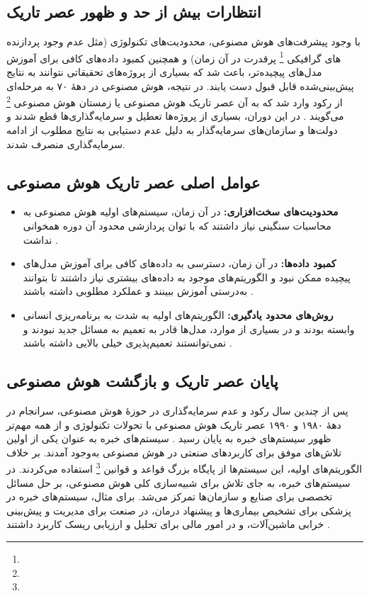 \subsection{انتظارات بیش از حد و ظهور عصر تاریک}

با وجود پیشرفت‌های هوش مصنوعی، محدودیت‌های تکنولوژی (مثل عدم وجود  پردازنده های گرافیکی  \footnote{} پرقدرت در آن زمان) و همچنین کمبود داده‌های کافی برای آموزش مدل‌های پیچیده‌تر، باعث شد که بسیاری از پروژه‌های تحقیقاتی نتوانند به نتایج پیش‌بینی‌شده قابل قبول دست یابند. در نتیجه، هوش مصنوعی در دههٔ ۷۰ به مرحله‌ای از رکود وارد شد که به آن عصر تاریک هوش مصنوعی یا زمستان هوش مصنوعی \footnote{} می‌گویند \cite{lighthill1973artificial,crevier1993ai}. در این دوران، بسیاری از پروژه‌ها تعطیل و سرمایه‌گذاری‌ها قطع شدند و دولت‌ها و سازمان‌های سرمایه‌گذار به دلیل عدم دستیابی به نتایج مطلوب از ادامه سرمایه‌گذاری منصرف شدند.


\subsection{عوامل اصلی عصر تاریک هوش مصنوعی}

\begin{itemize}
	\item \textbf{محدودیت‌های سخت‌افزاری:}  
	در آن زمان، سیستم‌های اولیه هوش مصنوعی به محاسبات سنگینی نیاز داشتند که با توان پردازشی محدود آن دوره همخوانی نداشت \cite{nilsson2010quest}.
	
	\item \textbf{کمبود داده‌ها:}  
	در آن زمان، دسترسی به داده‌های کافی برای آموزش مدل‌های پیچیده ممکن نبود و الگوریتم‌های موجود به داده‌های بیشتری نیاز داشتند تا بتوانند به‌درستی آموزش ببینند و عملکرد مطلوبی داشته باشند \cite{crevier1993ai}.
	
	\item \textbf{روش‌های محدود یادگیری:}  
	الگوریتم‌های اولیه به شدت به برنامه‌ریزی انسانی وابسته بودند و در بسیاری از موارد، مدل‌ها قادر به تعمیم به مسائل جدید نبودند و نمی‌توانستند تعمیم‌پذیری خیلی بالایی داشته باشند \cite{russell2016artificial}.
\end{itemize}

\subsection{پایان عصر تاریک و بازگشت هوش مصنوعی}

پس از چندین سال رکود و عدم سرمایه‌گذاری در حوزهٔ هوش مصنوعی، سرانجام در دههٔ ۱۹۸۰ و ۱۹۹۰ عصر تاریک هوش مصنوعی با تحولات تکنولوژی و از همه مهم‌تر ظهور سیستم‌های خبره به پایان رسید \cite{feigenbaum1983handbook}. سیستم‌های خبره به عنوان یکی از اولین تلاش‌های موفق برای کاربردهای صنعتی در هوش مصنوعی به‌وجود آمدند. بر خلاف الگوریتم‌های اولیه، این سیستم‌ها از پایگاه بزرگ قواعد و قوانین \footnote{} استفاده می‌کردند. در سیستم‌های خبره، به جای تلاش برای شبیه‌سازی کلی هوش مصنوعی، بر حل مسائل تخصصی برای صنایع و سازمان‌ها تمرکز می‌شد. برای مثال، سیستم‌های خبره در پزشکی برای تشخیص بیماری‌ها و پیشنهاد درمان، در صنعت برای مدیریت و پیش‌بینی خرابی ماشین‌آلات، و در امور مالی برای تحلیل و ارزیابی ریسک کاربرد داشتند \cite{mccorduck2004machines}.

